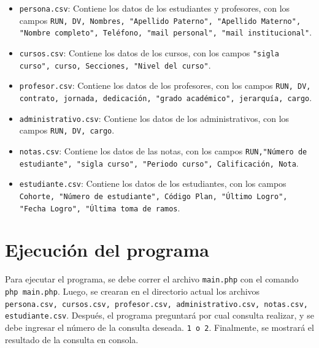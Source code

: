 \documentclass[12pt]{article}
\begin{document}
\begin{itemize}
    \item \texttt{persona.csv}: Contiene los datos de los estudiantes y profesores, con los campos \texttt{RUN, DV, Nombres, "Apellido Paterno", "Apellido Materno", "Nombre completo", Teléfono, "mail personal", "mail institucional"}.
    \item \texttt{cursos.csv}: Contiene los datos de los cursos, con los campos \texttt{"sigla curso", curso, Secciones, "Nivel del curso"}.
    \item \texttt{profesor.csv}: Contiene los datos de los profesores, con los campos \texttt{RUN, DV, contrato, jornada, dedicación, "grado académico", jerarquía, cargo}.
    \item \texttt{administrativo.csv}: Contiene los datos de los administrativos, con los campos \texttt{RUN, DV, cargo}.
    \item \texttt{notas.csv}: Contiene los datos de las notas, con los campos \texttt{RUN,"Número de estudiante", "sigla curso", "Periodo curso", Calificación, Nota}.
    \item \texttt{estudiante.csv}: Contiene los datos de los estudiantes, con los campos \texttt{Cohorte, "Número de estudiante", Código Plan, "Último Logro", "Fecha Logro", "Última toma de ramos}.
\end{itemize}

\section*{Ejecución del programa}

Para ejecutar el programa, se debe correr el archivo \texttt{main.php} con el comando \texttt{php main.php}.
Luego, se crearan en el directorio actual los archivos \texttt{persona.csv, cursos.csv, profesor.csv, administrativo.csv, notas.csv, estudiante.csv}.
Después, el programa preguntará por cual consulta realizar, y se debe ingresar el número de la consulta deseada. \texttt{1 o 2}.
Finalmente, se mostrará el resultado de la consulta en consola.
\end{document}
